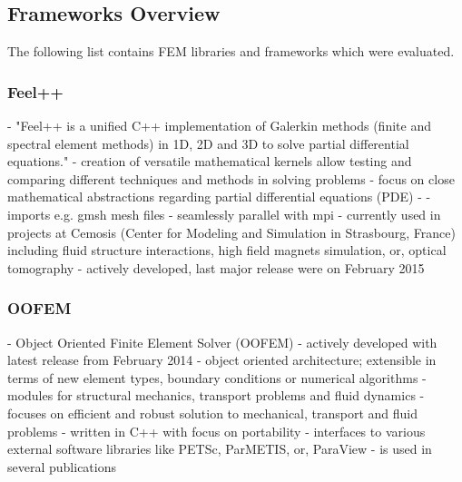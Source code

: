 \documentclass[11pt,twoside]{scrartcl}
\begin{document}
 \subsection{Frameworks Overview}
 The following list contains FEM libraries and frameworks which were evaluated.
  \subsubsection{Feel++}
  - "Feel++ is a unified C++ implementation of Galerkin methods (finite and spectral element methods) in 1D, 2D and 3D to solve partial differential equations."\cite{feelpp}\newline
  - creation of versatile mathematical kernels allow testing and comparing different techniques and methods in solving problems\newline
  - focus on close mathematical abstractions regarding partial differential equations (PDE)\newline
  - \cite{prud2012feel++}
  - imports e.g. gmsh mesh files\newline
  - seamlessly parallel with mpi\newline
  - currently used in projects at Cemosis (Center for Modeling and Simulation in Strasbourg, France) including fluid structure interactions, high field magnets simulation, or, optical tomography\newline
  - actively developed, last major release were on February 2015
  \subsubsection{OOFEM}\cite{oofem}
  - Object Oriented Finite Element Solver (OOFEM) 
  - actively developed with latest release from February 2014\newline
  - object oriented architecture; extensible in terms of new element types, boundary conditions or numerical algorithms\newline
  - modules for structural mechanics, transport problems and fluid dynamics\newline
  - focuses on efficient and robust solution to mechanical, transport and fluid problems\newline
  - written in C++ with focus on portability\newline
  - interfaces to various external software libraries like PETSc, ParMETIS, or, ParaView\newline
  - is used in several publications \cite{oofemPubs}
\end{document}
